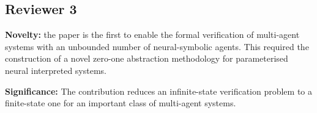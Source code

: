 \documentclass{article}
\begin{document}
\subsection*{Reviewer 3}

\textbf{Novelty:} the paper is the first to enable the formal verification of
multi-agent systems with an unbounded number of neural-symbolic agents. This
required the construction of a novel zero-one abstraction methodology for
parameterised neural interpreted systems.

\noindent
\textbf{Significance:} The contribution reduces an  infinite-state verification
problem to a finite-state one for an important class of multi-agent systems.
\end{document}
